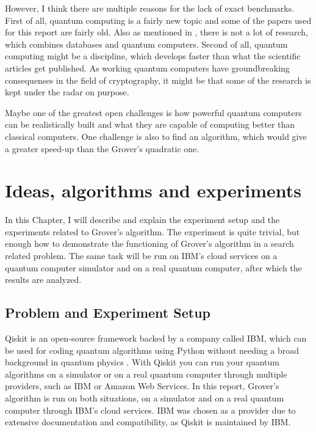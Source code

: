 \documentclass[english,oneside,openright]{UH_DS_report}
\begin{document}
However, I think there are multiple reasons for the lack of exact benchmarks. First of all, quantum computing is a fairly new topic and some of the papers used for this report are fairly old. Also as mentioned in \cite{qcdb}, there is not a lot of research, which combines databases and quantum computers. Second of all, quantum computing might be a discipline, which develops faster than what the scientific articles get published. As working quantum computers have groundbreaking consequenses in the field of cryptography, it might be that some of the research is kept under the radar on purpose.

Maybe one of the greatest open challenges is how powerful quantum computers can be realistically built and what they are capable of computing better than classical computers. One challenge is also to find an algorithm, which would give a greater speed-up than the Grover's quadratic one.

\chapter{Ideas, algorithms and experiments}
\label{chapter:ideas}

In this Chapter, I will describe and explain the experiment setup and the experiments related to Grover's algorithm. The experiment is quite trivial, but enough how to demonstrate the functioning of Grover's algorithm in a search related problem. The same task will be run on IBM's cloud services on a quantum computer simulator and on a real quantum computer, after which the results are analyzed.

\section{Problem and Experiment Setup}
Qiskit is an open-source framework backed by a company called IBM, which can be used for coding quantum algorithms using Python without needing a broad background in quantum physics \cite{https://doi.org/10.48550/arxiv.1903.04359}. With Qiskit you can run your quantum algorithms on a simulator or on a real quantum computer through multiple providers, such as IBM or Amazon Web Services. In this report, Grover's algorithm is run on both situations, on a simulator and on a real quantum computer through IBM's cloud services. IBM was chosen as a provider due to extensive documentation and compatibility, as Qiskit is maintained by IBM.
\end{document}
